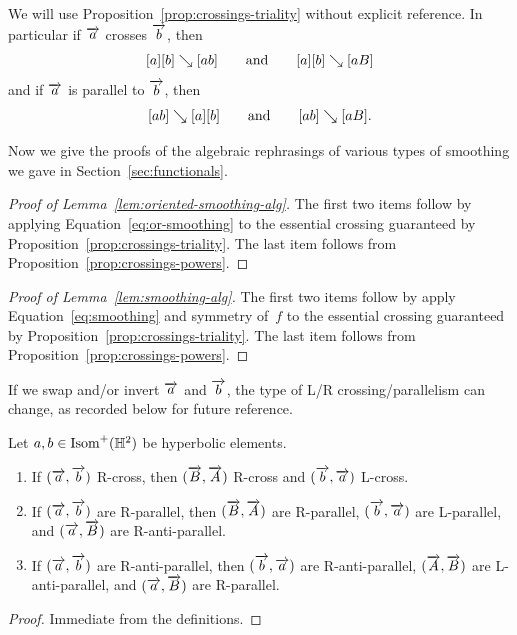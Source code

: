 We will use Proposition~\ref{prop:crossings-triality} without explicit
reference. In particular if $\overrightarrow{a}$ crosses $\overrightarrow{b}$, then
\[
  [a][b] \mathrel{\searrow} [ab]\qquad\text{and}\qquad[a][b] \mathrel{\searrow} [aB]
\]
and if $\overrightarrow{a}$ is parallel to $\overrightarrow{b}$, then
\[
  [ab] \mathrel{\searrow} [a][b]\qquad\text{and}\qquad[ab] \mathrel{\searrow} [aB].
\] 

Now we give the proofs of the algebraic rephrasings of various types
of smoothing we gave in Section~\ref{sec:functionals}.

\begin{proof}[Proof of Lemma~\ref{lem:oriented-smoothing-alg}]
The first two items follow by applying
Equation~\eqref{eq:or-smoothing} to the essential crossing guaranteed
by Proposition~\ref{prop:crossings-triality}.
The last item follows from Proposition~\ref{prop:crossings-powers}.
\end{proof}

\begin{proof}[Proof of Lemma~\ref{lem:smoothing-alg}]
The first two items follow by apply Equation~\eqref{eq:smoothing} and
symmetry of~$f$ to
the essential crossing guaranteed by Proposition~\ref{prop:crossings-triality}.
The last item follows from Proposition~\ref{prop:crossings-powers}.
\end{proof}

If we swap and/or invert $\overrightarrow{a}$ and $\overrightarrow{b}$, the type of L/R crossing/parallelism
can change, as recorded below for future reference.

\begin{lemma} Let $a,b\in \operatorname{Isom}^+(\mathbb{H}^2)$ be hyperbolic elements.
\begin{enumerate}
  \item If $(\overrightarrow{a},\overrightarrow{b})$ R-cross, then $(\overrightarrow{B},\overrightarrow{A})$
    R-cross and $(\overrightarrow{b},\overrightarrow{a})$ L-cross.
  \item If $(\overrightarrow{a},\overrightarrow{b})$ are R-parallel, then
    $(\overrightarrow{B},\overrightarrow{A})$ are R-parallel, $(\overrightarrow{b},\overrightarrow{a})$ are
    L-parallel, and $(\overrightarrow{a},\overrightarrow{B})$ are
    R-anti-parallel.
  \item If $(\overrightarrow{a},\overrightarrow{b})$ are R-anti-parallel, then
    $(\overrightarrow{b},\overrightarrow{a})$ are R-anti-parallel, $(\overrightarrow{A},\overrightarrow{B})$ are
    L-anti-parallel,
    and $(\overrightarrow{a},\overrightarrow{B})$
    are R-parallel.
\end{enumerate}
\end{lemma}

\begin{proof}
  Immediate from the definitions.
\end{proof}

